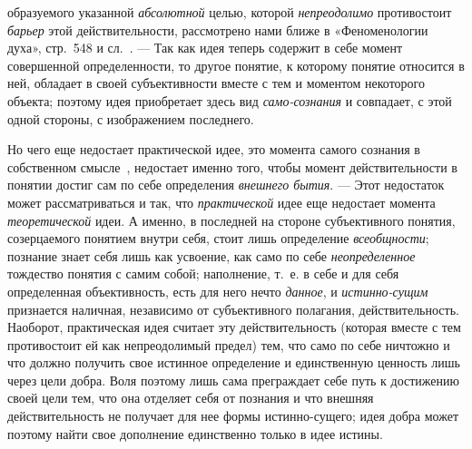 \documentclass[twoside]{article}
\begin{document}
образуемого указанной {\em абсолютной}
целью, которой
{\em непреодолимо}
противостоит {\em барьер}
этой действительности, рассмотрено нами ближе в
«Феноменологии духа», стр.~548 и
сл.~\label{bkm:bm118}.
— Так как идея теперь содержит в себе момент совершенной
определенности, то другое понятие, к которому понятие относится в ней,
обладает в своей субъективности вместе с тем и моментом некоторого объекта;
поэтому идея приобретает здесь вид
{\em само-сознания}
и совпадает, с этой одной стороны, с изображением
последнего.

Но чего еще недостает практической идее, это момента самого
сознания в собственном
смысле~\label{bkm:bm119},
недостает именно того, чтобы момент действительности в
понятии достиг сам по себе определения
{\em внешнего бытия}. —
Этот недостаток может рассматриваться и так, что
{\em практической} идее
еще недостает момента
{\em теоретической} идеи.
А именно, в последней на стороне субъективного понятия, созерцаемого
понятием внутри себя, стоит лишь определение
{\em всеобщности};
познание знает себя лишь как усвоение, как само по себе
{\em неопределенное}
тождество понятия с самим собой; наполнение, т.~е. в себе и
для себя определенная объективность, есть для него нечто
{\em данное}, и
{\em истинно-сущим}
признается наличная, независимо от субъективного полагания,
действительность. Наоборот, практическая идея считает эту действительность
(которая вместе с тем противостоит ей как непреодолимый предел) тем, что
само по себе ничтожно и что должно получить свое истинное определение и
единственную ценность лишь через цели добра. Воля поэтому лишь сама
преграждает себе путь к достижению своей цели тем, что она отделяет себя от
познания и что внешняя действительность не получает для нее формы
истинно-сущего; идея добра может поэтому найти свое дополнение единственно
только в идее истины.
\end{document}
